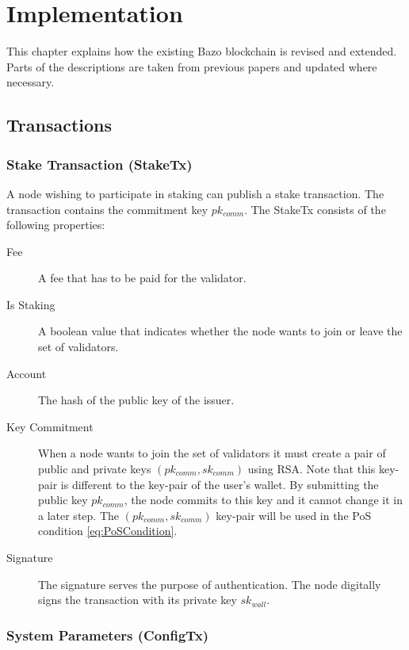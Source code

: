 
\chapter{Implementation}

\label{Chapter:Implementation}

This chapter explains how the existing Bazo blockchain is revised and extended. Parts of the descriptions are taken from previous papers \cite{Sgier17, Bachmann18, Blum18} and updated where necessary.

\section{Transactions}

\subsection{Stake Transaction (StakeTx)}
\label{Impl:StakeTx}

A node wishing to participate in staking can publish a stake transaction. The transaction contains the commitment key $pk_{comm}$. The StakeTx consists of the following properties:

\begin{description}
  \item[Fee] A fee that has to be paid for the validator.
  \item[Is Staking] A boolean value that indicates whether the node wants to join or leave the set of validators.
  \item[Account] The hash of the public key of the issuer.
  \item[Key Commitment] When a node wants to join the set of validators it must create a pair of public and private keys $(pk_{comm}, sk_{comm})$ using RSA. Note that this key-pair is different to the key-pair of the user's wallet. By submitting the public key $pk_{comm}$, the node commits to this key and it cannot change it in a later step. The $(pk_{comm}, sk_{comm})$ key-pair will be used in the PoS condition \ref{eq:PoSCondition}.
  \item[Signature] The signature serves the purpose of authentication. The node digitally signs the transaction with its private key $sk_{wall}$.
\end{description}

\subsection{System Parameters (ConfigTx)}


